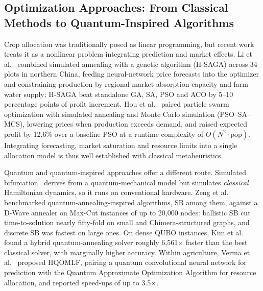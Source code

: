 \documentclass[conference,a4paper]{IEEEtran}
\begin{document}
\subsection{Optimization Approaches: From Classical Methods to Quantum-Inspired Algorithms}

Crop allocation was traditionally posed as linear programming, but recent
work treats it as a nonlinear problem integrating prediction and market
effects. Li et al.~\cite{li2025} combined simulated annealing with a genetic
algorithm (H-SAGA) across 34 plots in northern China, feeding neural-network
price forecasts into the optimizer and constraining production by regional
market-absorption capacity and farm water supply; H-SAGA beat standalone GA,
SA, PSO and ACO by 5--10 percentage points of profit increment. Hou et al.~\cite{hou2026} paired particle swarm optimization
with simulated annealing and Monte Carlo simulation (PSO--SA--MCS), lowering
prices when production exceeds demand, and raised expected profit by 12.6\%
over a baseline PSO at a runtime complexity of $O(N^2\cdot\mathrm{pop})$.
Integrating forecasting, market saturation and resource limits into a single
allocation model is thus well established with classical metaheuristics.

Quantum and quantum-inspired approaches offer a different route. Simulated
bifurcation~\cite{goto2021} derives from a quantum-mechanical model but
simulates \emph{classical} Hamiltonian dynamics, so it runs on conventional
hardware. Zeng et al.~\cite{zeng2024} benchmarked quantum-annealing-inspired
algorithms, SB among them, against a D-Wave annealer on Max-Cut instances of
up to 20{,}000 nodes: ballistic SB cut time-to-solution nearly fifty-fold on
small and Chimera-structured graphs, and discrete SB was fastest on large
ones. On dense QUBO
instances, Kim et al.~\cite{kim2025} found a hybrid quantum-annealing solver
roughly 6{,}561$\times$ faster than the best classical solver, with marginally
higher accuracy. Within agriculture, Verma et al.~\cite{verma2025} proposed
HQOMLF, pairing a quantum convolutional neural network for prediction with the
Quantum Approximate Optimization Algorithm for resource allocation, and
reported speed-ups of up to 3.5$\times$.
\end{document}
